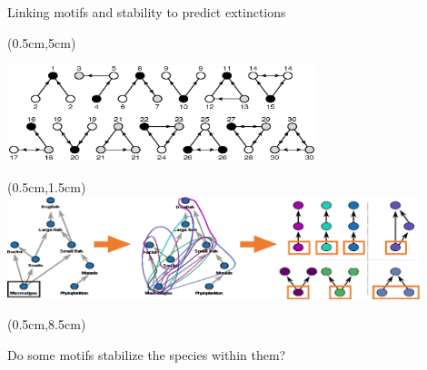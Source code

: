 \documentclass{beamer}
\begin{document}
  \begin{frame}{Linking motifs and stability to predict extinctions}

    \begin{textblock*}{12cm}(0.5cm,5cm)
      \begin{center}
        \includegraphics[width=9cm]{intro_figs/motifs_and_positions.eps}
        \end{center}       
    \end{textblock*}

    \begin{textblock*}{12cm}(0.5cm,1.5cm)
      \includegraphics[width=12cm]{intro_figs/role_breakdown.eps}
      \end{textblock*} 

    \begin{textblock*}{12cm}(0.5cm,8.5cm)
      \begin{center}
        {\color{DarkBlue}Do some motifs stabilize the species within them?}
        \end{center}       
    \end{textblock*} 

    \end{frame}
\end{document}
